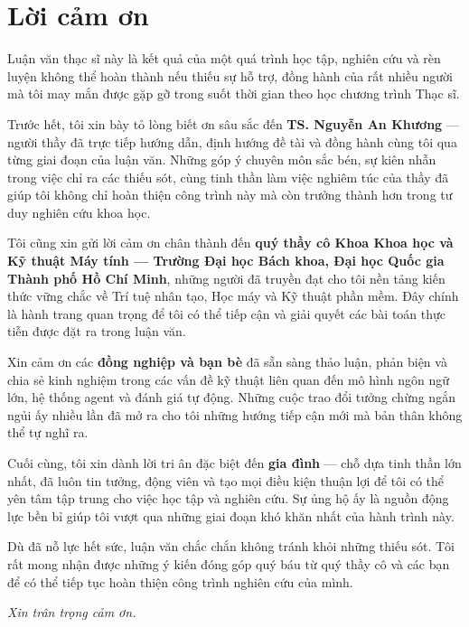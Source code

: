 \cleardoublepage
{}
{}
\chapter*{Lời cảm ơn}

Luận văn thạc sĩ này là kết quả của một quá trình học tập, nghiên cứu và rèn luyện không thể hoàn thành nếu thiếu sự hỗ trợ, đồng hành của rất nhiều người mà tôi may mắn được gặp gỡ trong suốt thời gian theo học chương trình Thạc sĩ.

Trước hết, tôi xin bày tỏ lòng biết ơn sâu sắc đến \textbf{TS. Nguyễn An Khương} — người thầy đã trực tiếp hướng dẫn, định hướng đề tài và đồng hành cùng tôi qua từng giai đoạn của luận văn. Những góp ý chuyên môn sắc bén, sự kiên nhẫn trong việc chỉ ra các thiếu sót, cùng tinh thần làm việc nghiêm túc của thầy đã giúp tôi không chỉ hoàn thiện công trình này mà còn trưởng thành hơn trong tư duy nghiên cứu khoa học.

Tôi cũng xin gửi lời cảm ơn chân thành đến \textbf{quý thầy cô Khoa Khoa học và Kỹ thuật Máy tính — Trường Đại học Bách khoa, Đại học Quốc gia Thành phố Hồ Chí Minh}, những người đã truyền đạt cho tôi nền tảng kiến thức vững chắc về Trí tuệ nhân tạo, Học máy và Kỹ thuật phần mềm. Đây chính là hành trang quan trọng để tôi có thể tiếp cận và giải quyết các bài toán thực tiễn được đặt ra trong luận văn.

Xin cảm ơn các \textbf{đồng nghiệp và bạn bè} đã sẵn sàng thảo luận, phản biện và chia sẻ kinh nghiệm trong các vấn đề kỹ thuật liên quan đến mô hình ngôn ngữ lớn, hệ thống agent và đánh giá tự động. Những cuộc trao đổi tưởng chừng ngắn ngủi ấy nhiều lần đã mở ra cho tôi những hướng tiếp cận mới mà bản thân không thể tự nghĩ ra.

Cuối cùng, tôi xin dành lời tri ân đặc biệt đến \textbf{gia đình} — chỗ dựa tinh thần lớn nhất, đã luôn tin tưởng, động viên và tạo mọi điều kiện thuận lợi để tôi có thể yên tâm tập trung cho việc học tập và nghiên cứu. Sự ủng hộ ấy là nguồn động lực bền bỉ giúp tôi vượt qua những giai đoạn khó khăn nhất của hành trình này.

Dù đã nỗ lực hết sức, luận văn chắc chắn không tránh khỏi những thiếu sót. Tôi rất mong nhận được những ý kiến đóng góp quý báu từ quý thầy cô và các bạn để có thể tiếp tục hoàn thiện công trình nghiên cứu của mình.

\vspace{1em}

\begin{flushright}
\textit{Xin trân trọng cảm ơn.}
\end{flushright}
